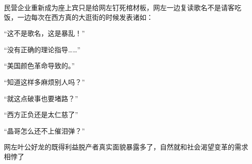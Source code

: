 \begin{zhihuanswer}
民营企业重新成为座上宾只是给网左钉死棺材板，网左一边复读歌名不是请客吃饭，一边每次在西方真的大逛街的时候发表诸如：

``这不是歌名，这是暴乱！''

``没有正确的理论指导\ldots\ldots{}''

``美国颜色革命导致的。''

``知道这样多麻烦别人吗？''

``就这点破事也要堵路？''

``西方正负还是太仁慈了''

``晶哥怎么还不上催泪弹？''

网左叶公好龙的既得利益脱产者真实面貌暴露多了，自然就和社会渴望变革的需求相悖了
\end{zhihuanswer}
